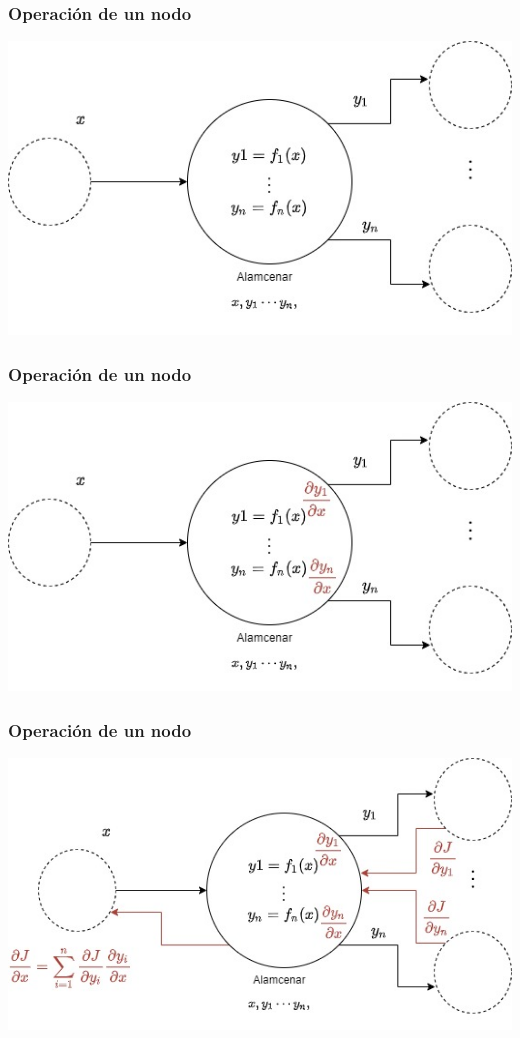 \documentclass{beamer}
\begin{document}
\begin{frame}
\frametitle{Operación de un nodo}
\includegraphics[scale=0.4]{im12}
\end{frame}
\begin{frame}
\frametitle{Operación de un nodo}
\includegraphics[scale=0.4]{im13}
\end{frame}
\begin{frame}
\frametitle{Operación de un nodo}
\includegraphics[scale=0.4]{im14}
\end{frame}
\end{document}
